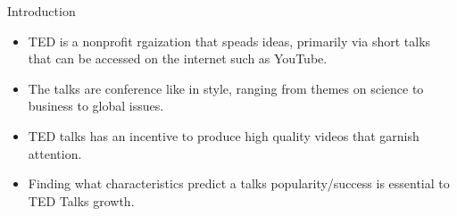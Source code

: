 \begin{frame}{Introduction}
    \begin{itemize}
		\item TED is a nonprofit rgaization that speads ideas, primarily via short talks that can be accessed on the internet such as YouTube.
		\item The talks are conference like in style, ranging from themes on science to business to global issues.
		\item TED talks has an incentive to produce high quality videos that garnish attention. 
		\item Finding what characteristics predict a talks popularity/success is essential to TED Talks growth.
    \end{itemize}
\end{frame}